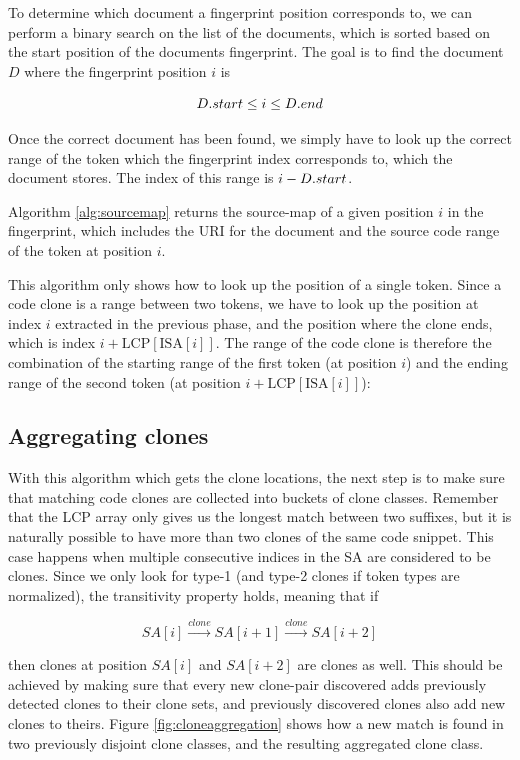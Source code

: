To determine which document a fingerprint position corresponds to, we can perform a binary
search on the list of the documents, which is sorted based on the start position of the
documents fingerprint. The goal is to find the document $D$ where the fingerprint position $i$
is 

$$
{{D}.{start}} \leq i \leq {{D}.{end}}
$$

Once the correct document has been found, we simply have to look up the correct range of
the token which the fingerprint index corresponds to, which the document stores. The index
of this range is $i - {{D}.{start}}$.

Algorithm \ref{alg:sourcemap} returns the source-map of a given position $i$ in the
fingerprint, which includes the URI for the document and the source code range of the
token at position $i$.

This algorithm only shows how to look up the position of a single token. Since a code
clone is a range between two tokens, we have to look up the position at index $i$
extracted in the previous phase, and the position where the clone ends, which is index $i
+ \text{LCP}[\text{ISA}[i]]$. The range of the code clone is therefore the combination of
the starting range of the first token (at position $i$) and the ending range of the second
token (at position $i + \text{LCP}[\text{ISA}[i]]$):

\subsection*{Aggregating clones}

With this algorithm which gets the clone locations, the next step is to make sure that
matching code clones are collected into buckets of clone classes. Remember that the LCP
array only gives us the longest match between two suffixes, but it is naturally possible
to have more than two clones of the same code snippet. This case happens when multiple
consecutive indices in the SA are considered to be clones. Since we only look for type-1
(and type-2 clones if token types are normalized), the transitivity property holds,
meaning that if

$$
SA[i] \xrightarrow{clone} SA[i+1] \xrightarrow{clone} SA[i + 2]
$$

then clones at position $SA[i]$ and $SA[i + 2]$ are clones as well. This should be
achieved by making sure that every new clone-pair discovered adds previously detected
clones to their clone sets, and previously discovered clones also add new clones to
theirs. Figure \ref{fig:cloneaggregation} shows how a new match is found in two previously
disjoint clone classes, and the resulting aggregated clone class.

